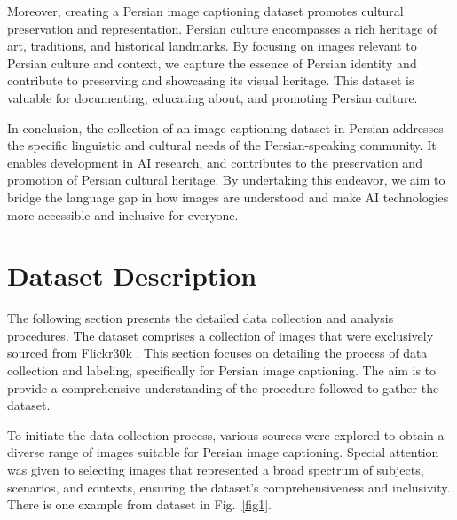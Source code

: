 \documentclass[runningheads]{llncs}
\begin{document}
Moreover, creating a Persian image captioning dataset promotes cultural preservation and representation. Persian culture encompasses a rich heritage of art, traditions, and historical landmarks. By focusing on images relevant to Persian culture and context, we capture the essence of Persian identity and contribute to preserving and showcasing its visual heritage. This dataset is valuable for documenting, educating about, and promoting Persian culture.

In conclusion, the collection of an image captioning dataset in Persian addresses the specific linguistic and cultural needs of the Persian-speaking community. It enables development in AI research, and contributes to the preservation and promotion of Persian cultural heritage. By undertaking this endeavor, we aim to bridge the language gap in how images are understood and make AI technologies more accessible and inclusive for everyone.

\section{Dataset Description}
The following section presents the detailed data collection and analysis procedures. The dataset comprises a collection of images that were exclusively sourced from Flickr30k \cite{Flickr30k}. This section focuses on detailing the process of data collection and labeling, specifically for Persian image captioning. The aim is to provide a comprehensive understanding of the procedure followed to gather the dataset.

To initiate the data collection process, various sources were explored to obtain a diverse range of images suitable for Persian image captioning. Special attention was given to selecting images that represented a broad spectrum of subjects, scenarios, and contexts, ensuring the dataset's comprehensiveness and inclusivity. There is one example from dataset in Fig.~\ref{fig1}. 
\end{document}
